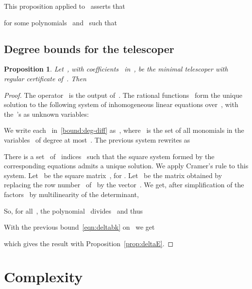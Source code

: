 \documentclass{sig-alternate}
\newtheorem{prop}[thm]{Proposition}
\begin{document}
This proposition applied to~ asserts that

for some polynomials~ and~ such that


\subsection{Degree bounds for the telescoper}
\begin{prop}\label{thm:delta-ck}
  Let~, with coefficients~ in~, be the minimal telescoper with regular certificate of~.
Then
  
\end{prop}

\begin{proof}
The operator~ is the output of~.
The rational functions~ form the unique solution to the following system of inhomogeneous linear equations over~, with the~'s as unknown variables:

We write each~ in~\eqref{bound:deg-diff} as~, where~ is the set of all monomials in the variables~ of degree at most~.
The previous system rewrites as

There is a set~ of~ indices~ such that the square system formed by the corresponding equations admits a unique solution.
We apply Cramer's rule to this system.
Let~ be the square matrix~, for .
Let~ be the matrix obtained by replacing the row number~ of~ by the vector~.
We get, after simplification of the factors~ by multilinearity of the determinant,

So, for all~, the polynomial~ divides~ and thus

With the previous bound~\eqref{eqn:deltabk} on~ we get

which gives the result with Proposition~\ref{prop:deltaE}.
\end{proof}

\section{Complexity}
\end{document}
